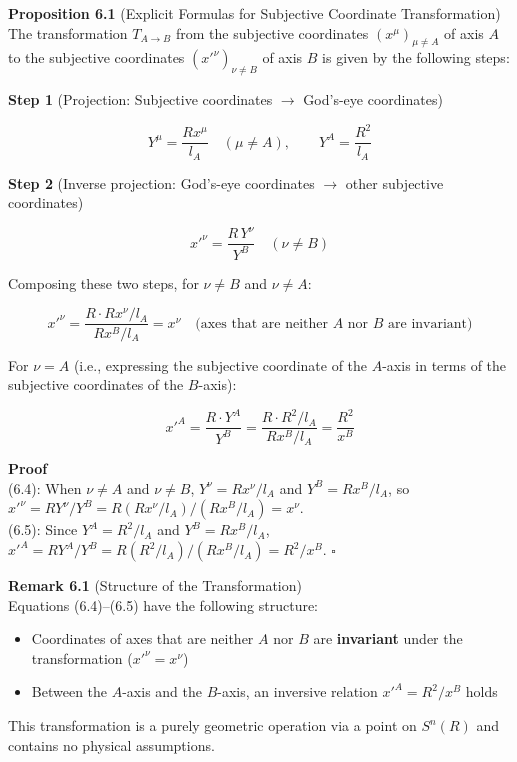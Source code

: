 \documentclass[a4paper,11pt]{article}
\theoremstyle{definition}
\providecommand{\tightlist}{\setlength{\itemsep}{0pt}\setlength{\parskip}{0pt}}
\begin{document}
\textbf{Proposition 6.1} (Explicit Formulas for Subjective Coordinate Transformation)\\
The transformation \(T_{A \to B}\) from the subjective coordinates \((x^\mu)_{\mu \neq A}\) of axis \(A\) to the subjective coordinates \((x'^\nu)_{\nu \neq B}\) of axis \(B\) is given by the following steps:

\textbf{Step 1} (Projection: Subjective coordinates \(\to\) God's-eye coordinates)

\[Y^\mu = \frac{Rx^\mu}{l_A} \quad (\mu \neq A), \qquad Y^A = \frac{R^2}{l_A} \tag{6.2}\]

\textbf{Step 2} (Inverse projection: God's-eye coordinates \(\to\) other subjective coordinates)

\[x'^\nu = \frac{R\,Y^\nu}{Y^B} \quad (\nu \neq B) \tag{6.3}\]

Composing these two steps, for \(\nu \neq B\) and \(\nu \neq A\):

\[x'^\nu = \frac{R \cdot Rx^\nu / l_A}{Rx^B/l_A} = x^\nu \quad \text{(axes that are neither $A$ nor $B$ are invariant)} \tag{6.4}\]

For \(\nu = A\) (i.e., expressing the subjective coordinate of the \(A\)-axis in terms of the subjective coordinates of the \(B\)-axis):

\[x'^A = \frac{R \cdot Y^A}{Y^B} = \frac{R \cdot R^2/l_A}{Rx^B/l_A} = \frac{R^2}{x^B} \tag{6.5}\]

\textbf{Proof}\\
(6.4): When \(\nu \neq A\) and \(\nu \neq B\), \(Y^\nu = Rx^\nu/l_A\) and \(Y^B = Rx^B/l_A\), so \(x'^\nu = RY^\nu/Y^B = R(Rx^\nu/l_A)/(Rx^B/l_A) = x^\nu\).\\
(6.5): Since \(Y^A = R^2/l_A\) and \(Y^B = Rx^B/l_A\), \(x'^A = RY^A/Y^B = R(R^2/l_A)/(Rx^B/l_A) = R^2/x^B\). \(\square\)

\textbf{Remark 6.1} (Structure of the Transformation)\\
Equations (6.4)--(6.5) have the following structure:

\begin{itemize}
\tightlist
\item
  Coordinates of axes that are neither \(A\) nor \(B\) are \textbf{invariant} under the transformation (\(x'^\nu = x^\nu\))
\item
  Between the \(A\)-axis and the \(B\)-axis, an inversive relation \(x'^A = R^2/x^B\) holds
\end{itemize}

This transformation is a purely geometric operation via a point on \(S^n(R)\) and contains no physical assumptions.
\end{document}
